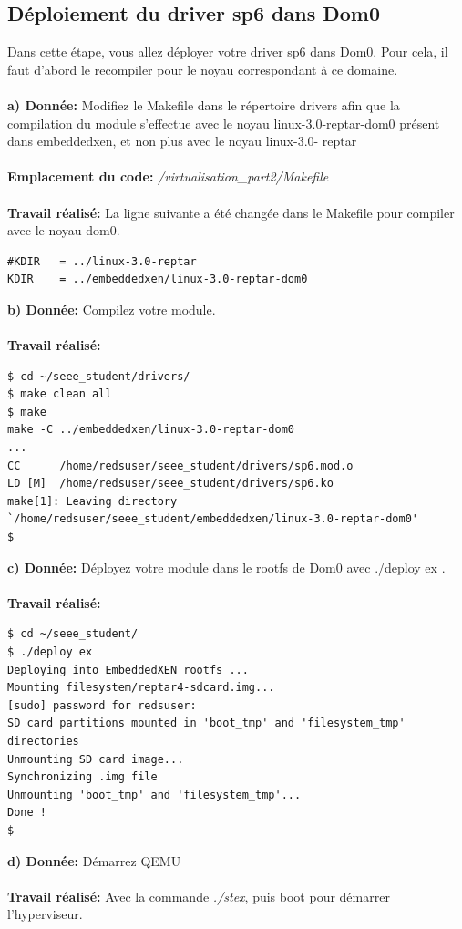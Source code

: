 \subsection{Déploiement du driver sp6 dans Dom0}
Dans cette étape, vous allez déployer votre driver sp6 dans Dom0. Pour cela, il faut d'abord le
recompiler pour le noyau correspondant à ce domaine.\\\\
\textbf{a) Donnée: }Modifiez le Makefile dans le répertoire drivers afin que la compilation du module s'effectue avec
le noyau linux-3.0-reptar-dom0 présent dans embeddedxen, et non plus avec le noyau linux-3.0-
reptar\\\\
\textbf{Emplacement du code: }\textit{/virtualisation\_part2/Makefile}\\\\
\textbf{Travail réalisé: }La ligne suivante a été changée dans le Makefile pour compiler avec le noyau dom0.
\begin{lstlisting}
#KDIR	= ../linux-3.0-reptar
KDIR	= ../embeddedxen/linux-3.0-reptar-dom0
\end{lstlisting}
\textbf{b) Donnée: }Compilez votre module.\\\\
\textbf{Travail réalisé: }
\begin{lstlisting}
$ cd ~/seee_student/drivers/
$ make clean all
$ make
make -C ../embeddedxen/linux-3.0-reptar-dom0 
...
CC      /home/redsuser/seee_student/drivers/sp6.mod.o
LD [M]  /home/redsuser/seee_student/drivers/sp6.ko
make[1]: Leaving directory `/home/redsuser/seee_student/embeddedxen/linux-3.0-reptar-dom0'
$ 
\end{lstlisting}
\textbf{c) Donnée: }Déployez votre module dans le rootfs de Dom0 avec ./deploy ex .\\\\
\textbf{Travail réalisé: }
\begin{lstlisting}
$ cd ~/seee_student/
$ ./deploy ex
Deploying into EmbeddedXEN rootfs ...
Mounting filesystem/reptar4-sdcard.img...
[sudo] password for redsuser: 
SD card partitions mounted in 'boot_tmp' and 'filesystem_tmp' directories
Unmounting SD card image...
Synchronizing .img file
Unmounting 'boot_tmp' and 'filesystem_tmp'...
Done !
$
\end{lstlisting}
\textbf{d) Donnée: }Démarrez QEMU\\\\
\textbf{Travail réalisé: }Avec la commande \textit{./stex}, puis boot pour démarrer l'hyperviseur.
